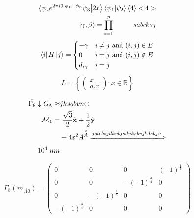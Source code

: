 \begin{equation}
	\begin{aligned}
		\braket{\psi_2  e^{2\pi i 0. \phi_1 \dots \phi_n } \psi_3 }{2x}
		\braket{\psi_1}{\psi_2}
		\langle 4 \rangle
		<4> \\ 
		\ket{\gamma,\beta}= \prod_{i=1}^{p} \, \; \ \qquad sabcksj
	\end{aligned}
\end{equation}
\begin{equation}
\begin{aligned}
\bra{i}H\ket{j} = 
\begin{cases}
-\gamma &  i\neq j\ \mathrm{and} \ (i,j) \in E
\\
0 & i=j \ \mathrm{and} \ (i,j) \notin E
\\
d_{i\gamma} & i=j
\end{cases}
\end{aligned}
\end{equation}
\begin{equation}
\begin{aligned}
L= \left\{ \begin{pmatrix}
	x
	\\
	a.x
\end{pmatrix}: x \in \mathbb{R} \right\}
\end{aligned}
\end{equation}

\begin{align}
	\bar{\Gamma_8} \downarrow G_{\Lambda} \approx& jksdbvn \oplus 
	\\
	\mathcal{M}_1=& \ \frac{\sqrt3}{2}\hat{\mathbf{x}}+\frac{1}{2}\hat{\mathbf{y}}
	\\
	& +4x^2 A^{\overset{\circ}{A}}
	\xLongrightarrow{jalcbsjdkvbjsdvksbvjkdsbjv}
	\\
	10^{4} \ nm
\end{align}






\begin{equation}
	\bar{\Gamma_8}(m_{1\bar{1}0})=\begin{pmatrix}
		0 &0 &0 &(-1)^\frac{1}{4}\\
		0&0&-(-1)^\frac{3}{4}&0\\
		0&-(-1)^\frac{1}{4}&0&0\\
		-(-1)^\frac{3}{4}&0&0&0
	\end{pmatrix}
\end{equation}





